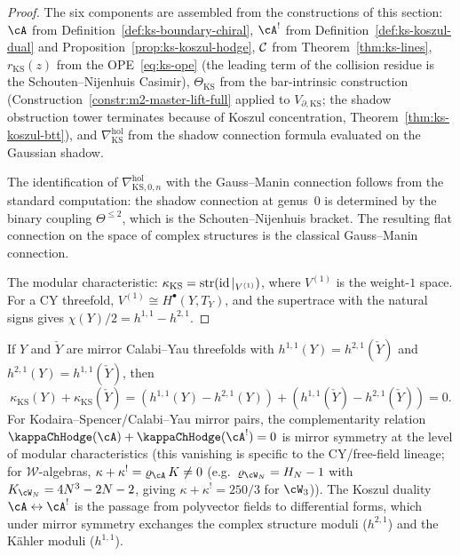 \begin{proof}
The six components are assembled from the constructions of this
section:
$\cA$ from Definition~\ref{def:ks-boundary-chiral},
$\cA^!$ from Definition~\ref{def:ks-koszul-dual} and
Proposition~\ref{prop:ks-koszul-hodge},
$\mathcal C$ from Theorem~\ref{thm:ks-lines},
$r_{\mathrm{KS}}(z)$ from the OPE~\eqref{eq:ks-ope} (the
leading term of the collision residue is the Schouten--Nijenhuis
Casimir),
$\Theta_{\mathrm{KS}}$ from the bar-intrinsic construction
(Construction~\ref{constr:m2-master-lift-full} applied to
$V_{\partial,\mathrm{KS}}$; the shadow obstruction tower terminates because
of Koszul concentration, Theorem~\ref{thm:ks-koszul-btt}),
and $\nabla^{\mathrm{hol}}_{\mathrm{KS}}$ from the shadow
connection formula evaluated on the Gaussian shadow.

The identification of $\nabla^{\mathrm{hol}}_{\mathrm{KS},0,n}$
with the Gauss--Manin connection follows from the standard
computation: the shadow connection at genus~$0$ is determined by
the binary coupling $\Theta^{\le 2}$, which is the
Schouten--Nijenhuis bracket. The resulting flat connection on
the space of complex structures is the classical Gauss--Manin
connection.

The modular characteristic: $\kappa_{\mathrm{KS}}
= \operatorname{str}(\operatorname{id}|_{V^{(1)}})$, where $V^{(1)}$ is the
weight-$1$ space. For a CY threefold,
$V^{(1)}\cong H^{\bullet}(Y,T_Y)$, and the supertrace with
the natural signs gives $\chi(Y)/2=h^{1,1}-h^{2,1}$.
\end{proof}

\begin{remark}
If $Y$ and $\check{Y}$ are mirror Calabi--Yau threefolds with
$h^{1,1}(Y)=h^{2,1}(\check{Y})$ and $h^{2,1}(Y)=h^{1,1}(\check{Y})$,
then
\[
\kappa_{\mathrm{KS}}(Y) + \kappa_{\mathrm{KS}}(\check{Y})
= (h^{1,1}(Y)-h^{2,1}(Y)) + (h^{1,1}(\check{Y})-h^{2,1}(\check{Y}))
= 0.
\]
For Kodaira--Spencer/Calabi--Yau mirror pairs, the complementarity relation $\kappaChHodge(\cA)+\kappaChHodge(\cA^!)=0$ is
mirror symmetry at the level of modular characteristics (this vanishing is specific to the CY/free-field lineage; for $\mathcal{W}$-algebras, $\kappa+\kappa^! = \varrho_{\cA}\,K \neq 0$
(e.g.\ $\varrho_{\cW_N} = H_N - 1$ with $K_{\cW_N} = 4N^3 - 2N - 2$,
giving $\kappa+\kappa^! = 250/3$ for $\cW_3$)). The
Koszul duality $\cA\leftrightarrow\cA^!$ is the passage from
polyvector fields to differential forms, which under mirror
symmetry exchanges the complex structure moduli ($h^{2,1}$) and
the K\"ahler moduli ($h^{1,1}$).
\end{remark}

